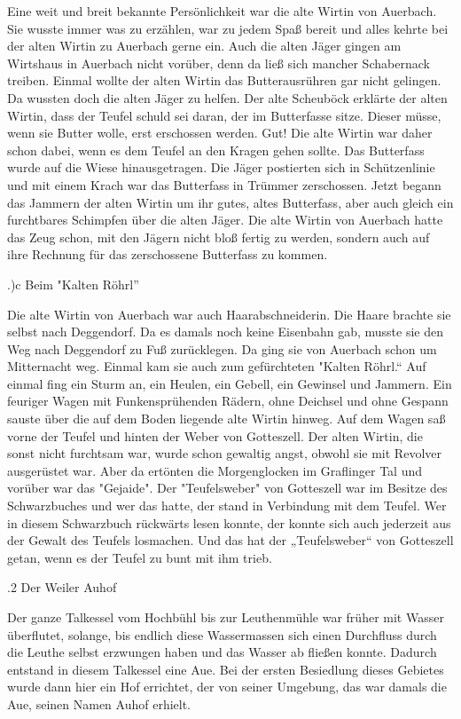 Eine weit und breit bekannte Persönlichkeit war die alte Wirtin von Auerbach.
Sie wusste immer was zu erzählen, war zu jedem Spaß bereit und alles kehrte bei
der alten Wirtin zu Auerbach gerne ein. Auch die alten Jäger gingen am Wirtshaus
in Auerbach nicht vorüber, denn da ließ sich mancher Schabernack treiben. Einmal
wollte der alten Wirtin das Butterausrühren gar nicht gelingen. Da wussten doch
die alten Jäger zu helfen. Der alte Scheuböck erklärte der alten Wirtin, dass
der Teufel schuld sei daran, der im Butterfasse sitze. Dieser müsse, wenn sie
Butter wolle, erst erschossen werden. Gut! Die alte Wirtin war daher schon
dabei, wenn es dem Teufel an den Kragen gehen sollte. Das Butterfass wurde auf
die Wiese hinausgetragen. Die Jäger postierten sich in Schützenlinie und mit
einem Krach war das Butterfass in Trümmer zerschossen. Jetzt begann das Jammern
der alten Wirtin um ihr gutes, altes Butterfass, aber auch gleich ein
furchtbares Schimpfen über die alten Jäger. Die alte Wirtin von Auerbach hatte
das Zeug schon, mit den Jägern nicht bloß fertig zu werden, sondern auch auf
ihre Rechnung für das zerschossene Butterfass zu kommen.

.)c Beim "Kalten Röhrl”

 Die alte Wirtin von Auerbach war auch Haarabschneiderin. Die Haare brachte sie
 selbst nach Deggendorf. Da es damals noch keine Eisenbahn gab, musste sie den
 Weg nach Deggendorf zu Fuß zurücklegen. Da ging sie von Auerbach schon um
 Mitternacht weg. Einmal kam sie auch zum gefürchteten "Kalten Röhrl.“ Auf
 einmal fing ein Sturm an, ein Heulen, ein Gebell, ein Gewinsel und Jammern. Ein
 feuriger Wagen mit Funkensprühenden Rädern, ohne Deichsel und ohne Gespann
 sauste über die auf dem Boden liegende alte Wirtin hinweg. Auf dem Wagen saß
 vorne der Teufel und hinten der Weber von Gotteszell. Der alten Wirtin, die
 sonst nicht furchtsam war, wurde schon gewaltig angst, obwohl sie mit Revolver
 ausgerüstet war. Aber da ertönten die Morgenglocken im Graflinger Tal und
 vorüber war das "Gejaide". Der "Teufelsweber" von Gotteszell war im Besitze des
 Schwarzbuches und wer das hatte, der stand in Verbindung mit dem Teufel. Wer in
 diesem Schwarzbuch rückwärts lesen konnte, der konnte sich auch jederzeit aus
 der Gewalt des Teufels losmachen. Und das hat der „Teufelsweber“ von Gotteszell
 getan, wenn es der Teufel zu bunt mit ihm trieb.

.2 Der Weiler Auhof

Der ganze Talkessel vom Hochbühl bis zur Leuthenmühle war früher mit Wasser
überflutet, solange, bis endlich diese Wassermassen sich einen Durchfluss durch
die Leuthe selbst erzwungen haben und das Wasser ab fließen konnte. Dadurch
entstand in diesem Talkessel eine Aue. Bei der ersten Besiedlung dieses Gebietes
wurde dann hier ein Hof errichtet, der von seiner Umgebung, das war damals die
Aue, seinen Namen Auhof erhielt.

